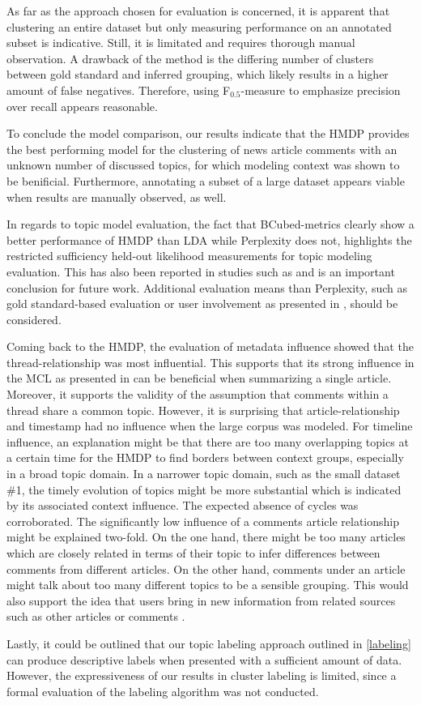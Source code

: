 As far as the approach chosen for evaluation is concerned, it is apparent that clustering an entire dataset but only measuring performance on an annotated subset is indicative. Still, it is limitated and requires thorough manual observation. A drawback of the method is the differing number of clusters between gold standard and inferred grouping, which likely results in a higher amount of false negatives. Therefore, using F$_{0.5}$-measure to emphasize precision over recall appears reasonable. \par
To conclude the model comparison, our results indicate that the HMDP provides the best performing model for the clustering of news article comments with an unknown number of discussed topics, for which modeling context was shown to be benificial. Furthermore, annotating a subset of a large dataset appears viable when results are manually observed, as well. 
\par In regards to topic model evaluation, the fact that BCubed-metrics clearly show a better performance of HMDP than LDA while Perplexity does not, highlights the restricted sufficiency held-out likelihood measurements for topic modeling evaluation. This has also been reported in studies such as \cite{NIPS2009_3700} and is an important conclusion for future work. Additional evaluation means than Perplexity, such as gold standard-based evaluation or user involvement as presented in \cite{NIPS2009_3700}, should be considered. \par
Coming back to the HMDP, the evaluation of metadata influence showed that the thread-relationship was most influential. This supports that its strong influence in the MCL as presented in \cite{DBLP:conf/ecir/AkerKBPBHG16} can be beneficial when summarizing a single article. Moreover, it supports the validity of the assumption that comments within a thread share a common topic. However, it is surprising that article-relationship and timestamp had no influence when the large corpus was modeled. For timeline influence, an explanation might be that there are too many overlapping topics at a certain time for the HMDP to find borders between context groups, especially in a broad topic domain. In a narrower topic domain, such as the small dataset \#1, the timely evolution of topics might be more substantial which is indicated by its associated context influence. The expected absence of cycles was corroborated. The significantly low influence of a comments article relationship might be explained two-fold. On the one hand, there might be too many articles which are closely related in terms of their topic to infer differences between comments from different articles. On the other hand, comments under an article might talk about too many different topics to be a sensible grouping. This would also support the idea that users bring in new information from related sources such as other articles or comments \cite{DBLP:conf/cikm/MaSYC12}. \par
Lastly, it could be outlined that our topic labeling approach outlined in \autoref{labeling} can produce descriptive labels when presented with a sufficient amount of data. However, the expressiveness of our results in cluster labeling is limited, since a formal evaluation of the labeling algorithm was not conducted.

\clearpage